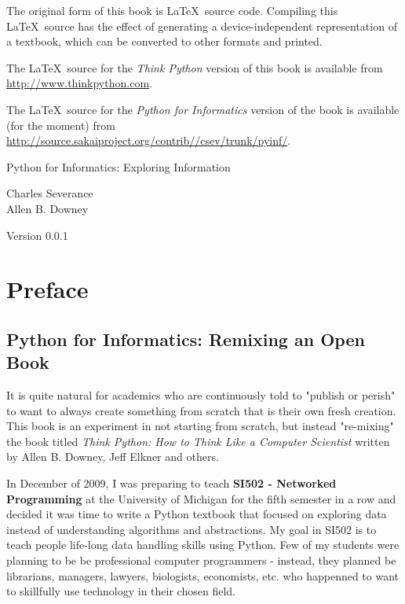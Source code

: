 \documentclass[10pt]{book}
\newcommand{\thetitle}{Python for Informatics: Exploring Information}
\newcommand{\theversion}{0.0.1}
\begin{document}
\begin{latexonly}
{The original form of this book is \LaTeX\ source code.  Compiling this
\LaTeX\ source has the effect of generating a device-independent
representation of a textbook, which can be converted to other formats
and printed.

The \LaTeX\ source for the 
{\em Think Python} version of this book is available from
\url{http://www.thinkpython.com}.

The \LaTeX\ source for the 
{\em Python for Informatics}
version of the book is available (for the moment) from 
\url{http://source.sakaiproject.org/contrib//csev/trunk/pyinf/}.

\vspace{0.2in}

} %

\end{latexonly}



\begin{htmlonly}


{\Large \thetitle}

{\large 
Charles Severance\\
Allen B. Downey}

Version \theversion

\setcounter{chapter}{-1}

\end{htmlonly}

\chapter{Preface}

\section*{Python for Informatics: Remixing an Open Book}

It is quite natural for academics who are continuously told to 
"publish or perish" to want to always create something from scratch
that is their own fresh creation.   This book is an 
experiment in not starting from scratch, but instead "re-mixing"
the book titled
{\em Think Python: How to Think Like
a Computer Scientist}
written by Allen B. Downey, Jeff Elkner and others.

In December of 2009, I was preparing to teach
{\bf SI502 - Networked Programming} at the University of Michigan
for the fifth semester in a row and decided it was time
to write a Python textbook that focused on exploring data
instead of understanding algorithms and abstractions.
My goal in SI502 is to teach people life-long data handling 
skills using Python.  Few of my
students were planning to be be professional 
computer programmers - instead, they
planned be librarians, managers, lawyers, biologists, economists, etc. 
who happenned to want to skillfully use technology in their chosen field.
\end{document}
